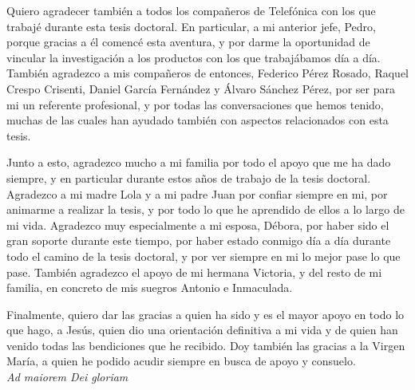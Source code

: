 Quiero agradecer también a todos los compañeros de Telefónica con los que trabajé durante esta tesis doctoral. En particular, a mi anterior jefe, Pedro, porque gracias a él comencé esta aventura, y por darme la oportunidad de vincular la investigación a los productos con los que trabajábamos día a día. También agradezco a mis compañeros de entonces, Federico Pérez Rosado, Raquel Crespo Crisenti, Daniel García Fernández y Álvaro Sánchez Pérez, por ser para mi un referente profesional, y por todas las conversaciones que hemos tenido, muchas de las cuales han ayudado también con aspectos relacionados con esta tesis.

Junto a esto, agradezco mucho a mi familia por todo el apoyo que me ha dado siempre, y en particular durante estos años de trabajo de la tesis doctoral. Agradezco a mi madre Lola y a mi padre Juan por confiar siempre en mi, por animarme a realizar la tesis, y por todo lo que he aprendido de ellos a lo largo de mi vida. Agradezco muy especialmente a mi esposa, Débora, por haber sido el gran soporte durante este tiempo, por haber estado conmigo día a día durante todo el camino de la tesis doctoral, y por ver siempre en mi lo mejor pase lo que pase. También agradezco el apoyo de mi hermana Victoria, y del resto de mi familia, en concreto de mis suegros Antonio e Inmaculada.

Finalmente, quiero dar las gracias a quien ha sido y es el mayor apoyo en todo lo que hago, a Jesús, quien dio una orientación definitiva a mi vida y de quien han venido todas las bendiciones que he recibido. Doy también las gracias a la Virgen María, a quien he podido acudir siempre en busca de apoyo y consuelo. \\

\textit{Ad maiorem Dei gloriam}


{}

\newpage